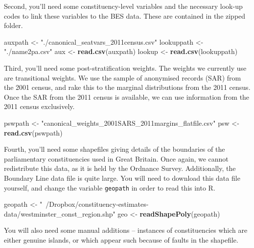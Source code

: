 \documentclass[12pt,twoside]{article}
\newenvironment{Shaded}{}{}
\newcommand{\KeywordTok}[1]{\textcolor[rgb]{0.00,0.44,0.13}{\textbf{{#1}}}}
\newcommand{\StringTok}[1]{\textcolor[rgb]{0.25,0.44,0.63}{{#1}}}
\newcommand{\NormalTok}[1]{{#1}}
\begin{document}
Second, you'll need some constituency-level variables and the necessary
look-up codes to link these variables to the BES data. These are
contained in the zipped folder.

\begin{Shaded}
\begin{Highlighting}[]
\NormalTok{auxpath <-}\StringTok{ "./canonical_seatvars_2011census.csv"}
\NormalTok{lookuppath <-}\StringTok{ "./name2pa.csv"}
\NormalTok{aux <-}\StringTok{ }\KeywordTok{read.csv}\NormalTok{(auxpath)}
\NormalTok{lookup <-}\StringTok{ }\KeywordTok{read.csv}\NormalTok{(lookuppath)}
\end{Highlighting}
\end{Shaded}

Third, you'll need some post-stratification weights. The weights we
currently use are transitional weights. We use the sample of anonymised
records (SAR) from the 2001 census, and rake this to the marginal
distributions from the 2011 census. Once the SAR from the 2011 census is
available, we can use information from the 2011 census exclusively.

\begin{Shaded}
\begin{Highlighting}[]
\NormalTok{pswpath <-}\StringTok{ "canonical_weights_2001SARS_2011margins_flatfile.csv"}
\NormalTok{psw <-}\StringTok{ }\KeywordTok{read.csv}\NormalTok{(pswpath)}
\end{Highlighting}
\end{Shaded}

Fourth, you'll need some shapefiles giving details of the boundaries of
the parliamentary constituencies used in Great Britain. Once again, we
cannot redistribute this data, as it is held by the Ordnance Survey.
Additionally, the Boundary Line data file is quite large. You will need
to download this data file yourself, and change the variable
\texttt{geopath} in order to read this into R.

\begin{Shaded}
\begin{Highlighting}[]
\NormalTok{geopath <-}\StringTok{ "~/Dropbox/constituency-estimates-data/westminster_const_region.shp"}
\NormalTok{geo <-}\StringTok{ }\KeywordTok{readShapePoly}\NormalTok{(geopath)}
\end{Highlighting}
\end{Shaded}

You will also need some manual additions -- instances of constituencies
which are either genuine islands, or which appear such because of faults
in the shapefile.
\end{document}
